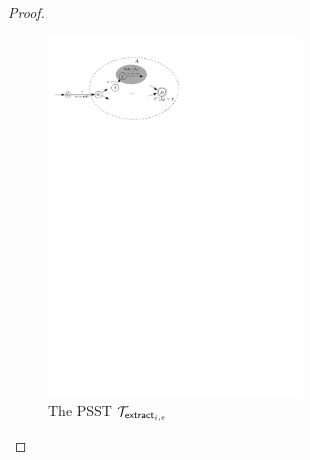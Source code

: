 \begin{proof}
        \begin{figure}[ht]
            \centering
            \includegraphics[width = 0.6\textwidth]{psst-extract.pdf}
            \caption{The PSST $\mathcal{T}_{\mathsf{extract}_{i,e}}$}
            \label{fig-psst-extract}
        \end{figure}


\end{proof}
